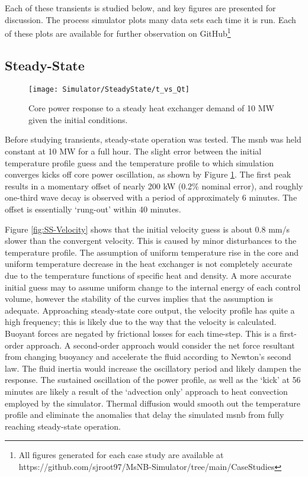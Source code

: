 Each of these transients is studied below, and key figures are presented for discussion. The process simulator plots many data sets each time it is run. Each of these plots are available for further observation on GitHub\footnote[2]{All figures generated for each case study are available at https://github.com/sjroot97/MsNB-Simulator/tree/main/CaseStudies}


\subsection{Steady-State}
\begin{figure}[ht!]
    \centering
    \texttt{[image: Simulator/SteadyState/t\_vs\_Qt]}
    \caption[Steady state power response]{Core power response to a steady heat exchanger demand of 10 MW given the initial conditions.}
    \label{fig:SS-Power}
\end{figure}

Before studying transients, steady-state operation was tested. The \acs{msnb} was held constant at 10 MW for a full hour. The slight error between the initial temperature profile guess and the temperature profile to which simulation converges kicks off core power oscillation, as shown by Figure \ref{fig:SS-Power}. The first peak results in a momentary offset of nearly 200 kW (0.2\% nominal error), and roughly one-third wave decay is observed with a period of approximately 6 minutes. The offset is essentially `rung-out' within 40 minutes.

Figure \ref{fig:SS-Velocity} shows that the initial velocity guess is about 0.8 mm/s slower than the convergent velocity. This is caused by minor disturbances to the temperature profile. The assumption of uniform temperature rise in the core and uniform temperature decrease in the heat exchanger is not completely accurate due to the temperature functions of specific heat and density. A more accurate initial guess may to assume uniform change to the internal energy of each control volume, however the stability of the curves implies that the assumption is adequate. Approaching steady-state core output, the velocity profile has quite a high frequency; this is likely due to the way that the velocity is calculated. Buoyant forces are negated by frictional losses for each time-step. This is a first-order approach. A second-order approach would consider the net force resultant from changing buoyancy and accelerate the fluid according to Newton's second law. The fluid inertia would increase the oscillatory period and likely dampen the response. The sustained oscillation of the power profile, as well as the `kick' at 56 minutes are likely a result of the `advection only' approach to heat convection employed by the simulator. Thermal diffusion would smooth out the temperature profile and eliminate the anomalies that delay the simulated \acs{msnb} from fully reaching steady-state operation.

